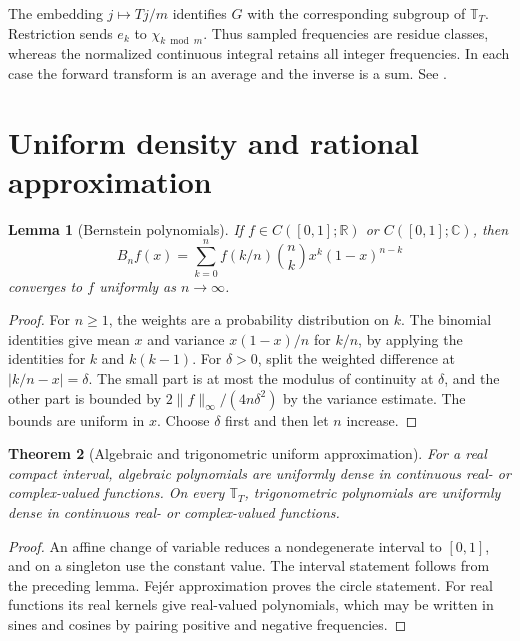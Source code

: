 \documentclass[11pt,oneside,openany]{book}
\newtheorem{theorem}{Theorem}[chapter]
\newtheorem{lemma}[theorem]{Lemma}
\theoremstyle{definition}
\theoremstyle{remark}
\begin{document}
The embedding $j\mapsto Tj/m$ identifies $G$ with the corresponding
subgroup of $\mathbb T_T$. Restriction sends $e_k$ to $\chi_{k\bmod m}$.
Thus sampled frequencies are residue classes, whereas the normalized
continuous integral retains all integer frequencies. In each
case the forward transform is an average and the inverse is a sum.
See \cite[Chapter~7, Sections~1--2]{stein-shakarchi}.

\section{Uniform density and rational approximation}

\begin{lemma}[Bernstein polynomials]
\label{p102:bernstein-polynomials}
If $f\in C([0,1];\mathbb R)$ or $C([0,1];\mathbb C)$, then
\[
 B_n f(x)=\sum_{k=0}^n f(k/n)\binom nk x^k(1-x)^{n-k}
\]
converges to $f$ uniformly as $n\to\infty$.
\end{lemma}

\begin{proof}
For $n\ge1$, the weights are a probability distribution on $k$.
The binomial identities give mean $x$ and variance $x(1-x)/n$
for $k/n$, by applying the identities for $k$ and $k(k-1)$.
For $\delta>0$, split the weighted difference at
$|k/n-x|=\delta$. The small part is at most the modulus of
continuity at $\delta$, and the other part is bounded by
$2\|f\|_\infty/(4n\delta^2)$ by the variance estimate. The bounds
are uniform in $x$. Choose $\delta$ first and then let $n$ increase.
\end{proof}

\begin{theorem}[Algebraic and trigonometric uniform approximation]
\label{p102:AN-13-C02-R01}
For a real compact interval, algebraic polynomials are uniformly
dense in continuous real- or complex-valued functions. On every
$\mathbb T_T$, trigonometric polynomials are uniformly dense in
continuous real- or complex-valued functions.
\end{theorem}

\begin{proof}
An affine change of variable reduces a nondegenerate interval to
$[0,1]$, and on a singleton use the constant value. The interval
statement follows from the preceding lemma. Fej\'er approximation
proves the circle statement. For real functions its real kernels
give real-valued polynomials, which may be written in sines and
cosines by pairing positive and negative frequencies.
\end{proof}
\end{document}
